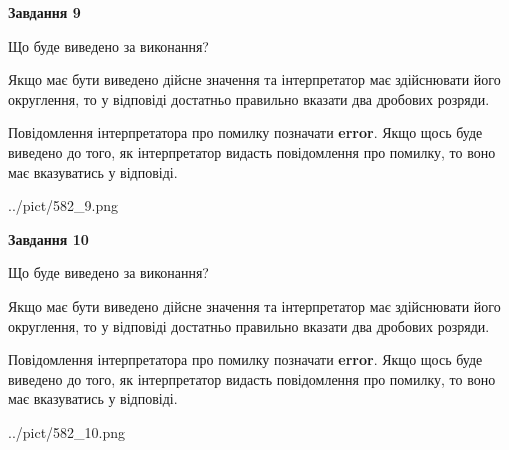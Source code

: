 \documentclass[12pt, ukrainian]{article}
\begin{document}
{\begin {Large}
{\begin {center}\textbf{Завдання 9}\end {center}}\par
Що буде виведено за виконання? \par

Якщо має бути виведено дійсне значення та інтерпретатор має здійснювати його округлення, 
то у відповіді достатньо правильно вказати два дробових розряди.

Повідомлення інтерпретатора про помилку позначати \textbf{error}.
Якщо щось буде виведено до того, як інтерпретатор видасть повідомлення про помилку, 
то воно має вказуватись у відповіді. \par

\begin{center}
	{../pict/582_9.png}
\end{center}
\newpage

{\begin {center}\textbf{Завдання 10}\end {center}}\par
Що буде виведено за виконання? \par

Якщо має бути виведено дійсне значення та інтерпретатор має здійснювати його округлення, 
то у відповіді достатньо правильно вказати два дробових розряди.

Повідомлення інтерпретатора про помилку позначати \textbf{error}.
Якщо щось буде виведено до того, як інтерпретатор видасть повідомлення про помилку, 
то воно має вказуватись у відповіді. \par

\begin{center}
	{../pict/582_10.png}
\end{center}
\newpage

\end {Large}}
\end{document}
